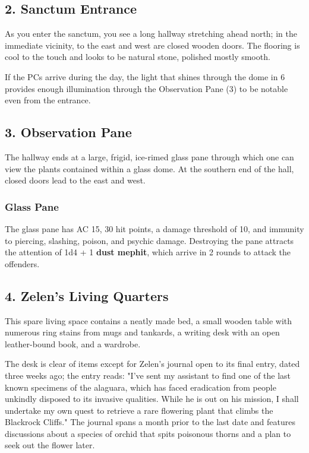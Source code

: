 \documentclass[10pt,a4paper,twoside,bg=print,twocolumn,openany,nodeprecatedcode]{dndbook}
\begin{document}
\subsection{2. Sanctum Entrance}
\begin{DndReadAloud}{}
As you enter the sanctum, you see a long hallway stretching ahead north; in the immediate vicinity, to the east and west are closed wooden doors. The flooring is cool to the touch and looks to be natural stone, polished mostly smooth.

\end{DndReadAloud}

If the PCs arrive during the day, the light that shines through the dome in 6 provides enough illumination through the Observation Pane (3) to be notable even from the entrance.

\subsection{3. Observation Pane}
\begin{DndReadAloud}{}
The hallway ends at a large, frigid, ice-rimed glass pane through which one can view the plants contained within a glass dome. At the southern end of the hall, closed doors lead to the east and west.

\end{DndReadAloud}

\subsubsection{Glass Pane}
The glass pane has AC 15, 30 hit points, a damage threshold of 10, and immunity to piercing, slashing, poison, and psychic damage. Destroying the pane attracts the attention of 1d4 + 1 \textbf{dust mephit}, which arrive in 2 rounds to attack the offenders.

\subsection{4. Zelen's Living Quarters}
\begin{DndReadAloud}{}
This spare living space contains a neatly made bed, a small wooden table with numerous ring stains from mugs and tankards, a writing desk with an open leather-bound book, and a wardrobe.

\end{DndReadAloud}

The desk is clear of items except for Zelen's journal open to its final entry, dated three weeks ago; the entry reads: "I've sent my assistant to find one of the last known specimens of the alaguara, which has faced eradication from people unkindly disposed to its invasive qualities. While he is out on his mission, I shall undertake my own quest to retrieve a rare flowering plant that climbs the Blackrock Cliffs." The journal spans a month prior to the last date and features discussions about a species of orchid that spits poisonous thorns and a plan to seek out the flower later.
\end{document}
